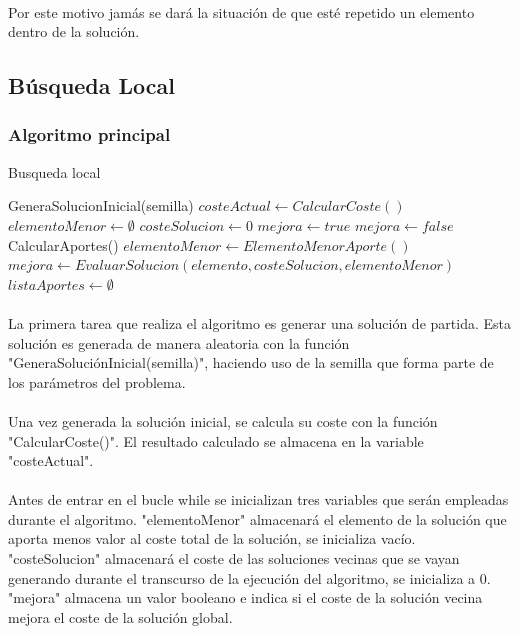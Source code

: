 \documentclass{article}
\begin{document}
	\paragraph{}Por este motivo jamás se dará la situación de que esté repetido un elemento dentro de la solución.
	
	
	\subsection{Búsqueda Local}
	
	\subsubsection{Algoritmo principal}
	\begin{algorithm}[H]
		\caption{Busqueda local}
		\begin{algorithmic}
			\STATE GeneraSolucionInicial(semilla)
			\STATE $costeActual \leftarrow CalcularCoste()$
			\STATE $elementoMenor \leftarrow \emptyset$
			\STATE $costeSolucion \leftarrow 0$
			\STATE $mejora \leftarrow true$
			\STATE $mejora \leftarrow false$
			\STATE CalcularAportes()
			\STATE $elementoMenor \leftarrow ElementoMenorAporte()$
			\STATE $mejora \leftarrow EvaluarSolucion(elemento, costeSolucion, elementoMenor)$
			\ENDIF
			\ENDFOR
			\STATE $listaAportes \leftarrow \emptyset$
			\ENDWHILE
		\end{algorithmic}
	\end{algorithm}
	
	\paragraph{} La primera tarea que realiza el algoritmo es generar una solución de partida. Esta solución es generada de manera aleatoria con la función "GeneraSoluciónInicial(semilla)", haciendo uso de la semilla que forma parte de los parámetros del problema.
	
	\paragraph{}Una vez generada la solución inicial, se calcula su coste con la función "CalcularCoste()". El resultado calculado se almacena en la variable "costeActual".
	
	\paragraph{}Antes de entrar en el bucle while se inicializan tres variables que serán empleadas durante el algoritmo. "elementoMenor" almacenará el elemento de la solución que aporta menos valor al coste total de la solución, se inicializa vacío. "costeSolucion" almacenará el coste de las soluciones vecinas que se vayan generando durante el transcurso de la ejecución del algoritmo, se inicializa a 0. "mejora" almacena un valor booleano e indica si el coste de la solución vecina mejora el coste de la solución global.
	
\end{document}
